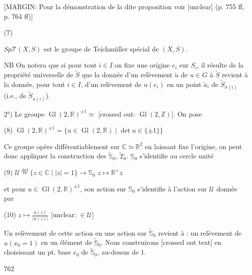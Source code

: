 [MARGIN: Pour la démonstration de la dite proposition voir [unclear] (p. 755 ff, p. 764 ff)]

(7)

$Sp\mathcal{T}(X,S)$ est le groupe de Teichmüller
spécial de $(X,S)$.

NB On notera que si pour tout $i \in I$ on
fixe une origine $e_i$ sur $S_i$, il
résulte de la propriété universelle de
$\tilde{S}$ que la donnée d'un relèvement
$\tilde{u}$ de $u \in G$ à $\tilde{S}$ revient à la donnée,
pour tout $i \in I$, d'un relèvement de
$u(e_i)$ en un point $\tilde{a}_i$ de $\tilde{S}_{\sigma(i)}$ (i.e., de $\tilde{S}_{u(i)}$).

\newpage


2°) Le groupe $\operatorname{Gl}(2, \mathbb{R})^{\pm 1} \simeq$ [crossed out: $\operatorname{Gl}(2, \mathbb{Z})$]. On pose

(8) $\operatorname{Gl}(2, \mathbb{R})^{\pm 1} = \{ u \in \operatorname{Gl}(2, \mathbb{R}) \mid \det u \in \{\pm 1\} \}$

Ce groupe opère différentiablement sur
$\mathbb{C} \simeq \mathbb{R}^2$ en laissant fixe l'origine,
on peut donc appliquer la construction
des $\tilde{\mathbb{S}}_0$, $\tilde{T}_0$. $\mathbb{S}_0$ s'identifie au
cercle unité

(9) $\mathcal{U} \overset{\text{déf}}{=} \{ z \in \mathbb{C} \mid |z|=1 \} \longrightarrow \mathbb{S}_0$
$z \longmapsto \mathbb{R}^+ z$

et pour $u \in \operatorname{Gl}(2, \mathbb{R})^{\pm 1}$, son action
sur $\mathbb{S}_0$ s'identifie à l'action sur $\mathcal{U}$
donnée par

(10) $z \longmapsto \frac{u(z)}{|u(z)|}$
[unclear: $\in \mathcal{U}$]

Un relèvement de cette action en une
action sur $\tilde{\mathbb{S}}_0$ revient à : un relèvement
de $u(x_0=1)$ en un élément de $\tilde{\mathbb{S}}_0$.
Nous construirons [crossed out text] en choisissant
un pt. base $e_0$ de $\tilde{\mathbb{S}}_0$, au-dessus de $1$.

\newpage


762

